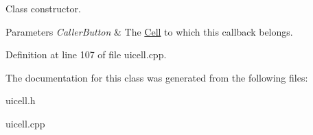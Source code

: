 Class constructor. 


\begin{DoxyParams}{Parameters}
{\em CallerButton} & The \hyperlink{classphys_1_1UI_1_1Cell}{Cell} to which this callback belongs. \\
\hline
\end{DoxyParams}


Definition at line 107 of file uicell.cpp.



The documentation for this class was generated from the following files:\begin{DoxyCompactItemize}
\item 
uicell.h\item 
uicell.cpp\end{DoxyCompactItemize}
